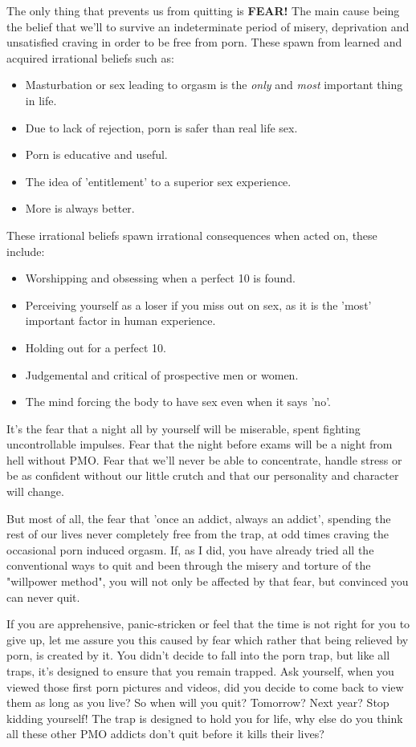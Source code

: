 \documentclass[easypeasy.tex]{subfiles}
\begin{document}
The only thing that prevents us from quitting is \textbf{FEAR!} The main cause being the belief that we'll to survive an indeterminate period of misery, deprivation and unsatisfied craving in order to be free from porn. These spawn from learned and acquired irrational beliefs such as:
    \begin{itemize}
      \item Masturbation or sex leading to orgasm is the \textit{only} and \textit{most} important thing in life.
      \item Due to lack of rejection, porn is safer than real life sex.
      \item Porn is educative and useful.
      \item The idea of 'entitlement' to a superior sex experience.
      \item More is always better.
    \end{itemize}
These irrational beliefs spawn irrational consequences when acted on, these include:
  \begin{itemize}
    \item Worshipping and obsessing when a perfect 10 is found.
    \item Perceiving yourself as a loser if you miss out on sex, as it is the 'most' important factor in human experience.
    \item Holding out for a perfect 10.
    \item Judgemental and critical of prospective men or women.
    \item The mind forcing the body to have sex even when it says 'no'.
  \end{itemize}

It's the fear that a night all by yourself will be miserable, spent fighting uncontrollable impulses. Fear that the night before exams will be a night from hell without PMO. Fear that we'll never be able to concentrate, handle stress or be as confident without our little crutch and that our personality and character will change.

But most of all, the fear that 'once an addict, always an addict', spending the rest of our lives never completely free from the trap, at odd times craving the occasional porn induced orgasm. If, as I did, you have already tried all the conventional ways to quit and been through the misery and torture of the "willpower method", you will not only be affected by that fear, but convinced you can never quit.

If you are apprehensive, panic-stricken or feel that the time is not right for you to give up, let me assure you this caused by fear which rather that being relieved by porn, is created by it. You didn't decide to fall into the porn trap, but like all traps, it's designed to ensure that you remain trapped. Ask yourself, when you viewed those first porn pictures and videos, did you decide to come back to view them as long as you live? So when will you quit? Tomorrow? Next year? Stop kidding yourself! The trap is designed to hold you for life, why else do you think all these other PMO addicts don't quit before it kills their lives?
\end{document}
